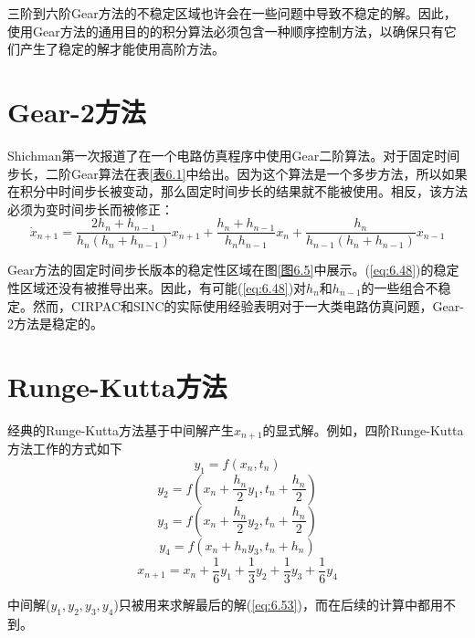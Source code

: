 三阶到六阶Gear方法的不稳定区域也许会在一些问题中导致不稳定的解。因此，使用Gear方法的通用目的的积分算法必须包含一种顺序控制方法，以确保只有它们产生了稳定的解才能使用高阶方法。

\section{Gear-2方法}
Shichman\cite{ref-41}第一次报道了在一个电路仿真程序中使用Gear二阶算法。对于固定时间步长，二阶Gear算法在表\ref{表6.1}中给出。因为这个算法是一个多步方法，所以如果在积分中时间步长被变动，那么固定时间步长的结果就不能被使用。相反，该方法必须为变时间步长\cite{ref-41}而被修正：
\begin{equation}
    \dot{x}_{n+1} = \frac{2h_n+h_{n-1}}{h_n(h_n+h_{n-1})}x_{n+1} + \frac{h_n+h_{n-1}}{h_nh_{n-1}}x_n + \frac{h_n}{h_{n-1}(h_n+h_{n-1})}x_{n-1}
    \label{eq:6.48}
\end{equation}

Gear方法的固定时间步长版本的稳定性区域在图\ref{图6.5}中展示。(\ref{eq:6.48})的稳定性区域还没有被推导出来。因此，有可能(\ref{eq:6.48})对$h_n$和$h_{n-1}$的一些组合不稳定。然而，CIRPAC\cite{ref-41,ref-42}和SINC的实际使用经验表明对于一大类电路仿真问题，Gear-2方法是稳定的。

\section{Runge-Kutta方法}
经典的Runge-Kutta方法\cite{ref-37,ref-49}基于中间解产生$x_{n+1}$的显式解。例如，四阶Runge-Kutta方法工作的方式如下
\begin{equation}
    y_1 = f(x_n, t_n)
    \label{eq:6.49}
\end{equation}
\begin{equation}
    y_2 = f(x_n + \frac{h_n}{2}y_1, t_n + \frac{h_n}{2})
    \label{eq:6.50}
\end{equation}
\begin{equation}
    y_3 = f(x_n + \frac{h_n}{2}y_2, t_n + \frac{h_n}{2})
    \label{eq:6.51}
\end{equation}
\begin{equation}
    y_4 = f(x_n + h_ny_3, t_n+h_n)
    \label{eq:6.52}
\end{equation}
\begin{equation}
    x_{n+1} = x_n + \frac{1}{6}y_1 + \frac{1}{3}y_2 + \frac{1}{3}y_3 + \frac{1}{6}y_4
    \label{eq:6.53}
\end{equation}

中间解($y_1, y_2, y_3, y_4$)只被用来求解最后的解(\ref{eq:6.53})，而在后续的计算中都用不到。

